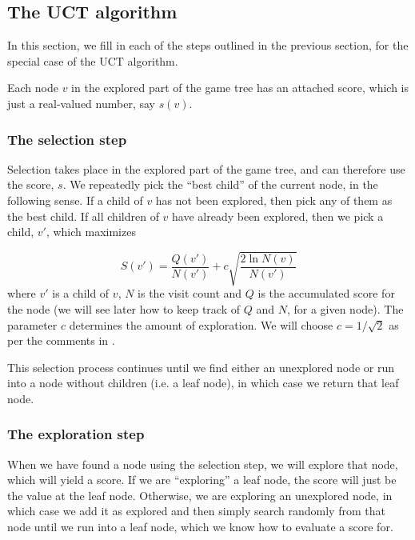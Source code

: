 \subsection{The UCT algorithm}
\label{sec:uct}

In this section, we fill in each of the steps outlined in the previous section, for the special case of the UCT algorithm.

Each node $v$ in the explored part of the game tree has an attached score, which is just a real-valued number, say $s(v)$.


\subsubsection{The selection step}

Selection takes place in the explored part of the game tree, and can therefore use the score, $s$.
We repeatedly pick the ``best child'' of the current node, in the following sense.
If a child of $v$ has not been explored, then pick any of them as the best child.
If all children of $v$ have already been explored, then we pick a child, $v'$, which maximizes

\begin{equation}
\label{eq:uctnodevalue}
S(v') = \frac{Q(v')}{N(v')} + c\sqrt{\frac{2\ln{N(v)}}{N(v')}}
\end{equation} 
where $v'$ is a child of $v$, $N$ is the visit count and $Q$ is the accumulated score for the node (we will see later how to keep track of $Q$ and $N$, for a given node).
The parameter $c$ determines the amount of exploration. We will choose $c = 1 / \sqrt 2$ as per the comments in \citep[p. 9]{mcts_survey12}.

This selection process continues until we find either an unexplored node or run into a node without children (i.e. a leaf node), in which case we return that leaf node.

\subsubsection{The exploration step}

When we have found a node using the selection step, we will explore that node, which will yield a score.
If we are ``exploring'' a leaf node, the score will just be the value at the leaf node.
Otherwise, we are exploring an unexplored node, in which case we add it as explored and then simply search randomly from that node until we run into a leaf node, which we know how to evaluate a score for.

